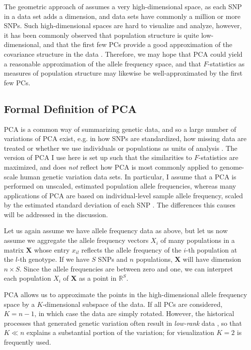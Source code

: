 \documentclass[12pt,fullpage, a4paper]{article}
\newcommand{\MX}{\mathbf{X}} %
\begin{document}
The geometric approach of \cite{oteo-garcia2021} assumes a very high-dimensional space, as each SNP in a data set adds a dimension, and data sets have commonly a million or more SNPs. Such high-dimensional spaces are hard to visualize and analyze, however, it has been commonly observed that population structure is quite low-dimensional, and that the first few PCs provide a good approximation of the covariance structure in the data \citep{patterson2006}. Therefore, we may hope that PCA could yield a reasonable approximation of the allele frequency space, and that $F$-statistics as measures of population structure may likewise be well-approximated by the first few PCs.





\subsection{Formal Definition of PCA}
PCA is a common way of summarizing genetic data, and so a large number of variations of PCA exist, e.g. in how SNPs are standardized, how missing data are treated or whether we use individuals or populations as units of analysis \citep{cavalli-sforza1994, patterson2006}. The version of PCA I use here is set up such that the similarities to  $F$-statistics are maximized, and does \emph{not} reflect how PCA is most commonly applied to genome-scale human genetic variation data sets. In particular, I assume that a PCA is performed on unscaled, estimated population allele frequencies, whereas many applications of PCA are based on individual-level sample allele frequency, scaled by the estimated standard deviation of each SNP \citep{patterson2006}. The differences this causes will be addressed in the discussion.

Let us again assume we have allele frequency data as above, but let us now assume we aggregate the allele frequency vectors $X_i$ of many populations in a matrix $\MX$ whose entry $x_{il}$ reflects the allele frequency of the $i$-th population at the $l$-th genotype. If we have $S$ SNPs and $n$ populations, $\MX$ will have dimension $n \times S$. Since the allele frequencies are between zero and one, we can interpret each population $X_i$
of $\MX$ as a point in $\mathbb{R}^S$.
	
PCA allows us to approximate the points in the high-dimensional allele frequency space by a $K$-dimensional subspace of the  data. If all PCs are considered, $K=n-1$, in which case the data are simply rotated. However, the  historical processes that generated genetic variation often result in \emph{low-rank} data \citep{engelhardt2010}, so that $K \ll n$ explains a substantial portion of the variation; for visualization $K=2$ is frequently used. 
		
\end{document}
